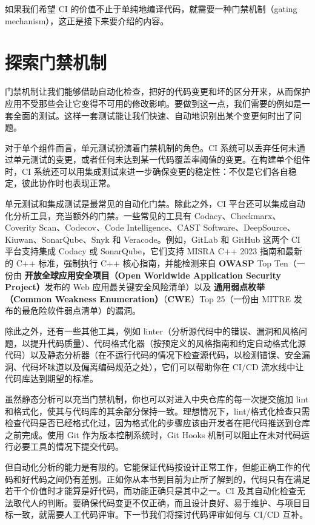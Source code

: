 \label{idx:914}
如果我们希望 CI 的价值不止于单纯地编译代码，就需要一种门禁机制（gating mechanism），这正是接下来要介绍的内容。

\section{探索门禁机制}

\label{idx:915}
门禁机制让我们能够借助自动化检查，把好的代码变更和坏的区分开来，从而保护应用不受那些会让它变得不可用的修改影响。要做到这一点，我们需要的例如是一套全面的测试。这样一套测试能让我们快速、自动地识别出某个变更何时出了问题。

\label{idx:916}
对于单个组件而言，单元测试扮演着门禁机制的角色。CI 系统可以丢弃任何未通过单元测试的变更，或者任何未达到某一代码覆盖率阈值的变更。在构建单个组件时，CI 系统还可以用集成测试来进一步确保变更的稳定性：不仅是它们各自稳定，彼此协作时也表现正常。

\label{idx:917}
单元测试和集成测试是最常见的自动化门禁。除此之外，CI 平台还可以集成自动化分析工具，充当额外的门禁。一些常见的工具有 Codacy、Checkmarx、Coverity Scan、Codecov、Code Intelligence、CAST Software、DeepSource、Kiuwan、SonarQube、Snyk 和 Veracode。例如，GitLab 和 GitHub 这两个 CI 平台支持集成 Codacy 或 SonarQube，它们支持 MISRA C++ 2023 指南和最新的 C++ 标准，强制执行 C++ 核心指南，并能检测来自 \textbf{OWASP} Top Ten（一份由 \textbf{开放全球应用安全项目（Open Worldwide Application Security Project）}发布的 Web 应用最关键安全风险清单）以及 \textbf{通用弱点枚举（Common Weakness Enumeration）}（\textbf{CWE}）Top 25（一份由 MITRE 发布的最危险软件弱点清单）的漏洞。

除此之外，还有一些其他工具，例如 linter（分析源代码中的错误、漏洞和风格问题，以提升代码质量）、代码格式化器（按预定义的风格指南和约定自动格式化源代码）以及静态分析器（在不运行代码的情况下检查源代码，以检测错误、安全漏洞、代码坏味道以及偏离编码规范之处），它们可以帮助你在 CI/CD 流水线中让代码库达到期望的标准。

\label{idx:918}
虽然静态分析可以充当门禁机制，你也可以对进入中央仓库的每一次提交施加 lint 和格式化，使其与代码库的其余部分保持一致。理想情况下，lint/格式化检查只需检查代码是否已经格式化过，因为格式化的步骤应该由开发者在把代码推送到仓库之前完成。使用 Git 作为版本控制系统时，Git Hooks 机制可以阻止在未对代码运行必要工具的情况下提交代码。

但自动化分析的能力是有限的。它能保证代码按设计正常工作，但能正确工作的代码和好代码之间仍有差别。正如你从本书到目前为止所了解到的，代码只有在满足若干个价值时才能算是好代码，而功能正确只是其中之一。CI 及其自动化检查无法取代人的判断。要确保代码变更不仅正确，而且设计良好、易于维护、与项目目标一致，就需要人工代码评审。下一节我们将探讨代码评审如何与 CI/CD 互补。

